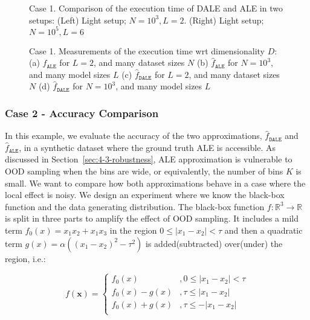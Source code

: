 \documentclass[wcp]{jmlr}
\newcommand{\dale}{\hat{f}_{\mathtt{DALE}}}
\newcommand{\R}{\mathbb{R}}
\begin{document}
\begin{figure}[h]
  \centering
  \resizebox{.4\columnwidth}{!}{}
  \resizebox{.43\columnwidth}{!}{}
  \caption[Case-1-fig-1]{Case 1. Comparison of the execution time of DALE
    and ALE in two setups: (Left) Light setup; \(N=10^3, L=2\).
    (Right) Light setup; \(N=10^5, L=6\)}
  \label{fig:case-1-plots-1}
\end{figure}

\begin{figure}[h]
  \centering
  \resizebox{.23\columnwidth}{!}{}
  \resizebox{.23\columnwidth}{!}{}
  \resizebox{.23\columnwidth}{!}{}
  \resizebox{.23\columnwidth}{!}{}
  \caption[Case-1-fig-2]{Case 1. Measurements of the execution time wrt dimensionality \(D\):
    (a) \(\hat{f}_{\mathtt{ALE}}\) for \(L = 2\), and many dataset sizes \(N\)
    (b) \(\hat{f}_{\mathtt{ALE}}\) for \(N = 10^3\), and many model sizes \(L\)
    (c) \(\dale\) for \(L = 2\), and many dataset sizes \(N\)
    (d) \(\dale\) for \(N = 10^3\), and many model sizes \(L\)
  }
  \label{fig:case-1-plots-2}
\end{figure}


\subsubsection{Case 2 - Accuracy Comparison}
\label{sec:example2}

In this example, we evaluate the accuracy of the two approximations,
\(\dale\) and \(\hat{f}_{\mathtt{ALE}}\), in a synthetic
dataset where the ground truth ALE is accessible. As discussed in
Section~\ref{sec:4-3-robustness}, ALE approximation is vulnerable to
OOD sampling when the bins are wide, or equivalently, the number of
bins \(K\) is small. We want to compare how both approximations behave
in a case where the local effect is noisy.
%
We design an experiment where we know the black-box function and the
data generating distribution. The black-box function
\(f:\R^3 \rightarrow \R\) is split in three parts to amplify the
effect of OOD sampling. It includes a mild term
\( f_0(x) = x_1x_2 + x_1x_3 \) in the region
\( 0 \leq |x_1 - x_2| < \tau \) and then a quadratic term
\(g(x) = \alpha ((x_1 - x_2)^2 - \tau^2)\) is added(subtracted)
over(under) the region, i.e.:

\begin{equation} \label{eq:example-2-mapping}
  f(\mathbf{x}) =
  \begin{cases}
    f_0(x) & , 0 \leq |x_1 - x_2|  < \tau \\
    f_0(x) - g(x) & , \tau \leq |x_1 - x_2|  \\
    f_0(x) + g(x) & , \tau \leq - |x_1 - x_2|  \\
  \end{cases}
\end{equation}
\end{document}
